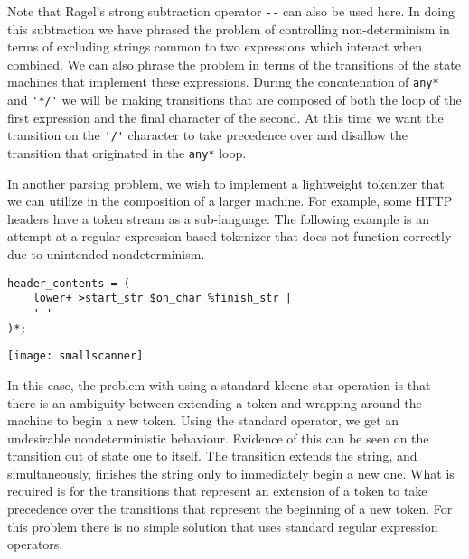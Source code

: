 \documentclass[letterpaper,11pt,oneside]{book}
\newcommand{\graphspace}{\vspace{10pt}}
\newenvironment{inline_code}{\def\baselinestretch{1}\vspace{12pt}\small}{}
\begin{document}
Note that Ragel's strong subtraction operator \verb|--| can also be used here.
In doing this subtraction we have phrased the problem of controlling non-determinism in
terms of excluding strings common to two expressions which interact when
combined.
We can also phrase the problem in terms of the transitions of the state
machines that implement these expressions. During the concatenation of
\verb|any*| and \verb|'*/'| we will be making transitions that are composed of
both the loop of the first expression and the final character of the second.
At this time we want the transition on the \verb|'/'| character to take precedence
over and disallow the transition that originated in the \verb|any*| loop.

In another parsing problem, we wish to implement a lightweight tokenizer that we can
utilize in the composition of a larger machine. For example, some HTTP headers
have a token stream as a sub-language. The following example is an attempt
at a regular expression-based tokenizer that does not function correctly due to
unintended nondeterminism.

\newpage

\begin{inline_code}
\begin{verbatim}
header_contents = ( 
    lower+ >start_str $on_char %finish_str | 
    ' '
)*;
\end{verbatim}
\end{inline_code}

\begin{center}
\texttt{[image: smallscanner]}
\end{center}
\graphspace

In this case, the problem with using a standard kleene star operation is that
there is an ambiguity between extending a token and wrapping around the machine
to begin a new token. Using the standard operator, we get an undesirable
nondeterministic behaviour. Evidence of this can be seen on the transition out
of state one to itself.  The transition extends the string, and simultaneously,
finishes the string only to immediately begin a new one.  What is required is
for the
transitions that represent an extension of a token to take precedence over the
transitions that represent the beginning of a new token. For this problem
there is no simple solution that uses standard regular expression operators.
\end{document}

